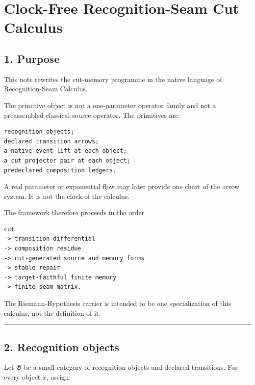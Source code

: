 \hypertarget{clock-free-recognition-seam-cut-calculus}{%
\chapter{Clock-Free Recognition-Seam Cut Calculus}\label{clock-free-recognition-seam-cut-calculus}}

\hypertarget{purpose}{%
\section{1. Purpose}\label{purpose}}

This note rewrites the cut-memory programme in the native language of
Recognition-Seam Calculus.

The primitive object is not a one-parameter operator family and not a
preassembled classical source operator. The primitives are:

\begin{verbatim}
recognition objects;
declared transition arrows;
a native event lift at each object;
a cut projector pair at each object;
predeclared composition ledgers.
\end{verbatim}

A real parameter or exponential flow may later provide one chart of the arrow
system. It is not the clock of the calculus.

The framework therefore proceeds in the order

\begin{verbatim}
cut
-> transition differential
-> composition residue
-> cut-generated source and memory forms
-> stable repair
-> target-faithful finite memory
-> finite seam matrix.
\end{verbatim}

The Riemann-Hypothesis carrier is intended to be one specialization of this
calculus, not the definition of it.

\begin{center}\rule{0.5\linewidth}{0.5pt}\end{center}

\hypertarget{recognition-objects}{%
\section{2. Recognition objects}\label{recognition-objects}}

Let \(\mathfrak G\) be a small category of recognition objects and declared
transitions. For every object \(x\), assign:

